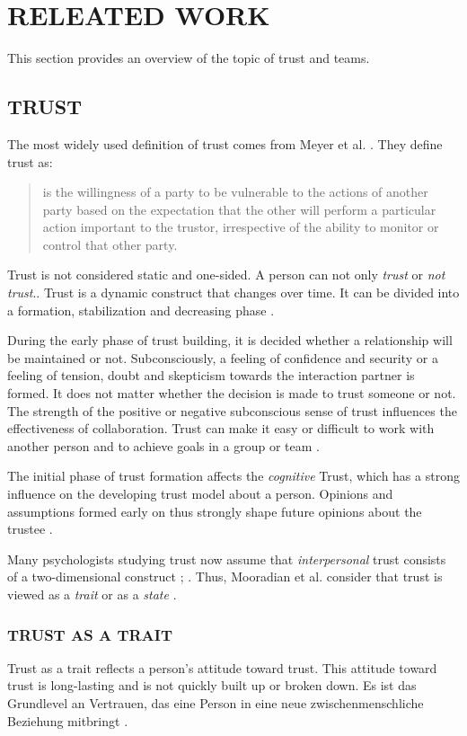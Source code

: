 \documentclass[sigchi]{acmart}
\begin{document}
\section{RELEATED WORK}
This section provides an overview of the topic of trust and teams.
\subsection{TRUST}
The most widely used definition of trust comes from Meyer et al. \citep[S. 712]{mayer1995integrative}. They define trust as:
\begin{quote} \grqq{}is the willingness of a party to be vulnerable to the actions of another party based on the expectation that the other will perform a particular action important to the trustor, irrespective of the ability to monitor or control that other party.\grqq{} \end{quote}

Trust is not considered static and one-sided. A person can not only \textit{trust} or \textit{not trust}.. Trust is a dynamic construct that changes over time. It can be divided into a formation, stabilization and decreasing phase \citep[S. 396]{rousseau1998not}.

During the early phase of trust building, it is decided whether a relationship will be maintained or not. Subconsciously, a feeling of confidence and security or a feeling of tension, doubt and skepticism towards the interaction partner is formed.
It does not matter whether the decision is made to trust someone or not. The strength of the positive or negative subconscious sense of trust influences the effectiveness of collaboration. Trust can make it easy or difficult to work with another person and to achieve goals in a group or team \citep[S. 405-406]{bigley1998straining}.

The initial phase of trust formation affects the \textit{cognitive} Trust, which has a strong influence on the developing trust model about a person.
Opinions and assumptions formed early on thus strongly shape future opinions about the trustee \citep[pp. 461-462]{baldwin1992relational}.

Many psychologists studying trust now assume that \textit{interpersonal} trust consists of a two-dimensional construct \citep{johnson2005cognitive}; \citep{cook1980new}. Thus, Mooradian et al. consider that trust is viewed as a \textit{trait} or as a \textit{state} \citep[pp. 524-525]{mooradian2006trusts}.

\subsubsection{TRUST AS A TRAIT }
Trust as a trait reflects a person's attitude toward trust. This attitude toward trust is long-lasting and is not quickly built up or broken down. Es ist das Grundlevel an Vertrauen, das eine Person in eine neue zwischenmenschliche Beziehung mitbringt \citep[S. 11]{couch1996assessment}. 
\end{document}
